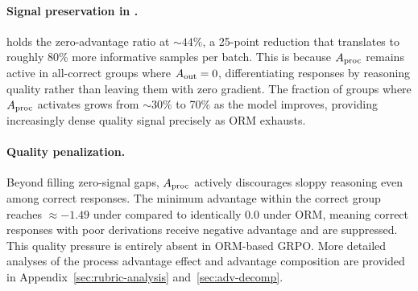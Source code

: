 \paragraph{Signal preservation in \method{}.} \method{} holds the zero-advantage ratio at ${\sim}44\%$, a 25-point reduction that translates to roughly 80\% more informative samples per batch. This is because $\aproc$ remains active in all-correct groups where $\aout = 0$, differentiating responses by reasoning quality rather than leaving them with zero gradient. The fraction of groups where $\aproc$ activates grows from ${\sim}30\%$ to 70\% as the model improves, providing increasingly dense quality signal precisely as ORM exhausts.

\paragraph{Quality penalization.} Beyond filling zero-signal gaps, $\aproc$ actively discourages sloppy reasoning even among correct responses. The minimum advantage within the correct group reaches $\approx -1.49$ under \method{} compared to identically 0.0 under ORM, meaning correct responses with poor derivations receive negative advantage and are suppressed. This quality pressure is entirely absent in ORM-based GRPO. More detailed analyses of the process advantage effect and advantage composition are provided in Appendix~\ref{sec:rubric-analysis} and~\ref{sec:adv-decomp}.
